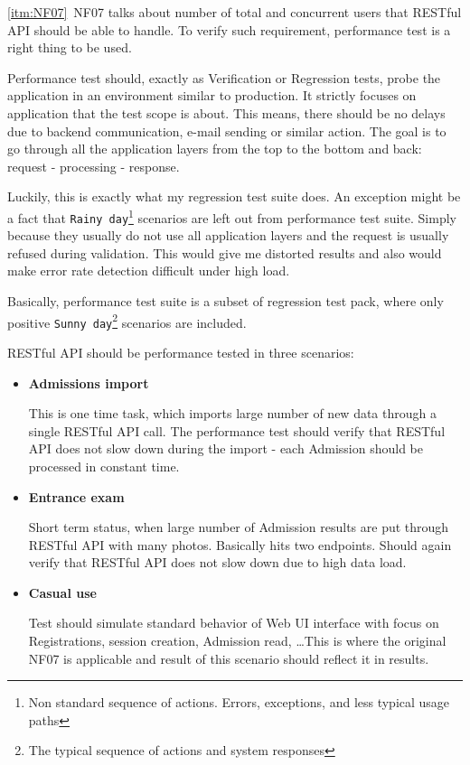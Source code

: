 	\ref{itm:NF07}~NF07 talks about number of total and concurrent users that RESTful API should be able to handle. To
	verify such requirement, performance test is a right thing to be used.
	
	Performance test should, exactly as Verification or Regression tests, probe the application in an environment similar
	to production.
	It strictly focuses on application that the test scope is about. This means, there should be no delays due to backend
	communication, e-mail sending or similar action. The goal is to go through all the application layers from the top to
	the bottom and back: request - processing - response.
	
	Luckily, this is exactly what my regression test suite does. An exception might be a fact that
	\verb|Rainy day|\footnote{Non standard sequence of actions. Errors, exceptions, and less typical usage paths}
	scenarios are left out from performance test suite. Simply because they usually do not use all application layers and the request is usually refused during validation. This would give me distorted results and also would make error rate
	detection difficult under high load.
	
	Basically, performance test suite is a subset of regression test pack, where only positive
	\verb|Sunny day|\footnote{The typical sequence of actions and system responses} scenarios are included.
	
	RESTful API should be performance tested in three scenarios:
	
	\begin{itemize}
		\item \textbf{Admissions import}
		
		This is one time task, which imports large number of new data through a single RESTful API call. The performance test
		should verify that RESTful API does not slow down during the import - each Admission should be processed in constant
		time.
		\item \textbf{Entrance exam}
		
		Short term status, when large number of Admission results are put through RESTful API with many photos. Basically hits
		two endpoints. Should again verify that RESTful API does not slow down due to high data load.
		\item \textbf{Casual use}
		
		Test should simulate standard behavior of Web UI interface with focus on Registrations, session creation, Admission
		read, \ldots This is where the original NF07 is applicable and result of this scenario should reflect it in results.
	\end{itemize}
	
